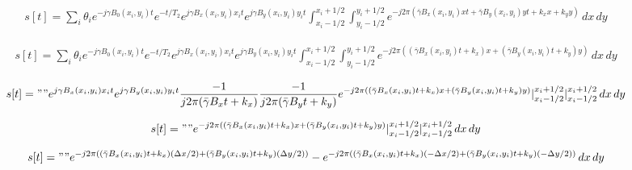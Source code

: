 \documentclass{article}
\begin{document}
\begin{align*}
    s[t] = \sum_i \theta_i e^{-j \gamma B_0(x_i, y_i) t} e^{-t/T_2} e^{j \gamma B_x(x_i,y_i) x_i t } e^{j \gamma B_y(x_i,y_i) y_i t} \int_{x_i - 1/2}^{x_i + 1/2} \int_{y_i - 1/2}^{y_i + 1/2} e^{-j 2 \pi (\bar\gamma B_x(x_i,y_i) x t + \bar\gamma B_y(x_i,y_i) y t + k_x x + k_y y)} \, dx \, dy
\end{align*}

\begin{align*}
    s[t] = \sum_i \theta_i e^{-j \gamma B_0(x_i, y_i) t} e^{-t/T_2} e^{j \gamma B_x(x_i,y_i) x_i t } e^{j \gamma B_y(x_i,y_i) y_i t} \int_{x_i - 1/2}^{x_i + 1/2} \int_{y_i - 1/2}^{y_i + 1/2} e^{-j 2 \pi ((\bar\gamma B_x(x_i,y_i) t + k_x) x  + (\bar\gamma B_y(x_i,y_i) t + k_y) y)} \, dx \, dy
\end{align*}

\begin{align*}
    s[t] = "" e^{j \gamma B_x(x_i,y_i) x_i t } e^{j \gamma B_y(x_i,y_i) y_i t} \frac{-1}{j2\pi (\bar\gamma B_x t + k_x)} \frac{-1}{j2\pi (\bar\gamma B_y t + k_y)} e^{-j 2 \pi ((\bar\gamma B_x(x_i,y_i) t + k_x) x  + (\bar\gamma B_y(x_i,y_i) t + k_y) y)} \rvert_{x_i - 1/2}^{x_i + 1/2} \rvert_{x_i - 1/2}^{x_i + 1/2} \, dx \, dy
\end{align*}

\begin{align*}
    s[t] = "" e^{-j 2 \pi ((\bar\gamma B_x(x_i,y_i) t + k_x) x  + (\bar\gamma B_y(x_i,y_i) t + k_y) y)} \rvert_{x_i - 1/2}^{x_i + 1/2} \rvert_{x_i - 1/2}^{x_i + 1/2} \, dx \, dy
\end{align*}

\begin{align*}
    s[t] = "" e^{-j 2 \pi ((\bar\gamma B_x(x_i,y_i) t + k_x) (\Delta x/2) + (\bar\gamma B_y(x_i,y_i) t + k_y) (\Delta y/2))} - e^{-j 2 \pi ((\bar\gamma B_x(x_i,y_i) t + k_x) (-\Delta x/2) + (\bar\gamma B_y(x_i,y_i) t + k_y) (-\Delta y/2))} \, dx \, dy
\end{align*}
\end{document}
